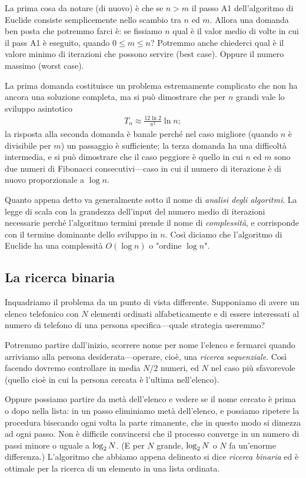 La prima cosa da notare (di nuovo) \`e che se $n > m$ il passo A1 dell'algoritmo di
Euclide consiste semplicemente nello scambio tra $n$ ed $m$. Allora una domanda ben posta
che potremmo farci \`e: se fissiamo $n$ qual \`e il valor medio di volte in cui
il pass A1 \`e eseguito, quando $0 \leq m \leq n$? Potremmo anche chiederci qual
\`e il valore minimo di iterazioni che possono servire (best case). Oppure il numero
massimo (worst case).

La prima domanda costituisce un problema estremamente complicato che non ha ancora
una soluzione completa, ma si pu\`o dimostrare che per $n$ grandi vale lo sviluppo
asintotico
\begin{align*}
  T_n \approx \frac{12 \ln 2}{\pi^2} \ln n;
\end{align*}
la risposta alla seconda domanda \`e banale perch\'e nel caso migliore (quando
$n$ \`e divisibile per $m$) un passaggio \`e sufficiente; la terza domanda ha una
difficolt\`a intermedia, e si pu\`o dimostrare che il caso peggiore \`e quello in
cui $n$ ed $m$ sono due numeri di Fibonacci consecutivi---caso in cui il numero
di iterazione \`e di nuovo proporzionale a $\log n$.

Quanto appena detto va generalmente sotto il nome di \emph{analisi degli algoritmi}.
La legge di scala con la grandezza dell'input del numero medio di iterazioni necessarie
perch\'e l'algoritmo termini prende il nome di \emph{complessit\`a}, e corrisponde
con il termine dominante dello sviluppo in $n$. Cos\`i diciamo che l'algoritmo di
Euclide ha una complessit\`a $O(\log n)$ o "ordine $\log n$".


\subsection{La ricerca binaria}

Inquadriamo il problema da un punto di vista differente. Supponiamo di avere
un elenco telefonico con $N$ elementi ordinati alfabeticamente e di essere
interessati al numero di telefono di una persona specifica---quale strategia
useremmo?

Potremmo partire dall'inizio, scorrere nome per nome l'elenco e fermarci quando
arriviamo alla persona desiderata---operare, cioè, una
\emph{ricerca sequenziale}. Così facendo dovremo controllare in media
$N/2$ numeri, ed $N$ nel caso più sfavorevole (quello cioè in cui la
persona cercata è l'ultima nell'elenco).

Oppure possiamo partire da metà dell'elenco e vedere se il nome cercato
è prima o dopo nella lista: in un passo eliminiamo metà dell'elenco, e
possiamo ripetere la procedura bisecando ogni volta la parte rimanente, che in
questo modo si dimezza ad ogni passo. Non è difficile convincersi che il
processo converge in un numero di passi minore o uguale a $\llog[2] N$.
(E per $N$ grande, $\llog[2] N$ o $N$ fa un'enorme differenza.) L'algoritmo
che abbiamo appena delineato si dice \emph{ricerca binaria} ed è ottimale
per la ricerca di un elemento in una lista ordinata.

